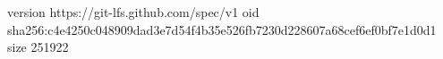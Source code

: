 version https://git-lfs.github.com/spec/v1
oid sha256:c4e4250c048909dad3e7d54f4b35e526fb7230d228607a68cef6ef0bf7e1d0d1
size 251922
